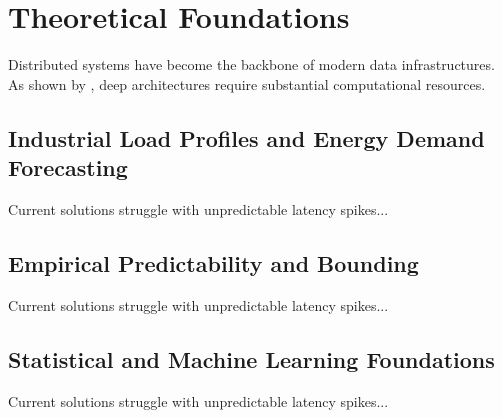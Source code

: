 \chapter{Theoretical Foundations}
\label{chap:theoreticalFoundation}

Distributed systems have become the backbone of modern data infrastructures. As shown by \textcite{vaswani2017attention}, deep architectures require substantial computational resources.


\section{Industrial Load Profiles and Energy Demand Forecasting}
\label{sec:industrialEnergyDemand}

Current solutions struggle with unpredictable latency spikes...


\section{Empirical Predictability and Bounding}
\label{sec:definitionPredictability}

Current solutions struggle with unpredictable latency spikes...


\section{Statistical and Machine Learning Foundations}
\label{sec:statisticalMLFoundations}

Current solutions struggle with unpredictable latency spikes...